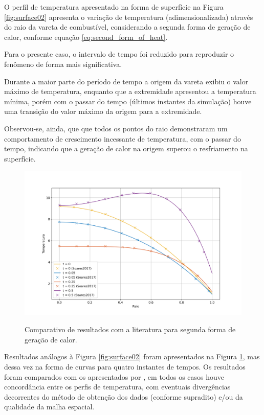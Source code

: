 O perfil de temperatura apresentado na forma de superfície na Figura \ref{fig:surface02} apresenta o variação de temperatura (adimensionalizada) através do raio da vareta de combustível, considerando a segunda forma de geração de calor, conforme equação \ref{eq:second_form_of_heat}.

Para o presente caso, o intervalo de tempo foi reduzido para reproduzir o fenômeno de forma mais significativa.

Durante a maior parte do período de tempo a origem da vareta exibiu o valor máximo de temperatura, enquanto que a extremidade apresentou a temperatura mínima, porém com o passar do tempo (últimos instantes da simulação) houve uma transição do valor máximo da origem para a extremidade.

Observou-se, ainda, que que todos os pontos do raio demonstraram um comportamento de crescimento incessante de temperatura, com o passar do tempo, indicando que a geração de calor na origem superou o resfriamento na superfície.

\begin{figure}[H]
    \centering
    \caption{Comparativo de resultados com a literatura para segunda forma de geração de calor.}
    \includegraphics[scale=0.5]{figures/results/Fig06.png}
    \label{fig:profile02}
\end{figure}

Resultados análogos à Figura \ref{fig:surface02} foram apresentados na Figura \ref{fig:profile02}, mas dessa vez na forma de curvas para quatro instantes de tempos. Os resultados foram comparados com os apresentados por \citet{soares2017}, em todos os casos houve concordância entre os perfis de temperatura, com eventuais divergências decorrentes do método de obtenção dos dados (conforme supradito) e/ou da qualidade da malha espacial.

